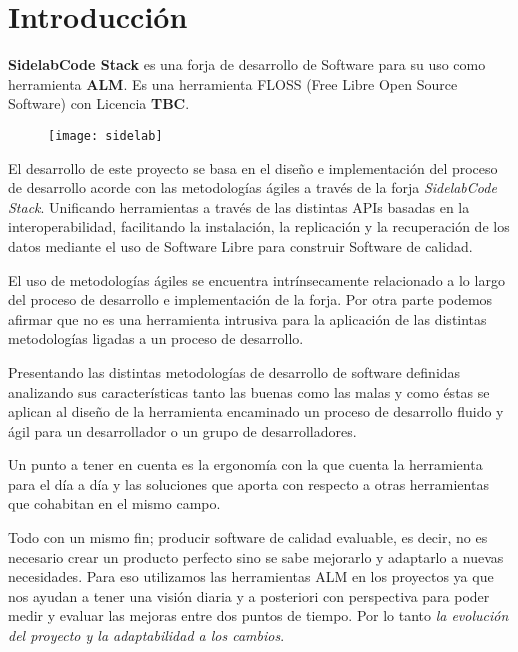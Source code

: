 \chapter{Introducci\'on}
\label{chap:introduccion}

\par \textbf{SidelabCode Stack} es una forja de desarrollo de Software para su uso como herramienta \textbf{ALM}. Es una herramienta FLOSS (Free Libre Open Source Software) con Licencia \textbf{TBC}.

\begin{figure}[h]
    \begin{center}	
        \texttt{[image: sidelab]}
        \label{fig:sidelab}
    \end{center}
\end{figure}

\par El desarrollo de este proyecto se basa en el dise\~no e implementaci\'on del proceso de desarrollo acorde con las metodolog\'ias \'agiles a trav\'es de la forja \emph{SidelabCode Stack}. Unificando herramientas a trav\'es de las distintas APIs basadas en la interoperabilidad, facilitando la instalaci\'on, la replicaci\'on y la recuperaci\'on de los datos mediante el uso de Software Libre para construir Software de calidad.

\par El uso de metodolog\'ias \'agiles se encuentra intr\'insecamente relacionado a lo largo del proceso de desarrollo e implementaci\'on de la forja. Por otra parte podemos afirmar que no es una herramienta intrusiva para la aplicaci\'on de las distintas metodolog\'ias ligadas a un proceso de desarrollo.

\par Presentando las distintas metodolog\'ias de desarrollo de software definidas analizando sus caracter\'isticas tanto las buenas como las malas y como \'estas se aplican al dise\~no de la herramienta encaminado un proceso de desarrollo fluido y \'agil para un desarrollador o un grupo de desarrolladores.

\par Un punto a tener en cuenta es la ergonom\'ia con la que cuenta la herramienta para el d\'ia a d\'ia y las soluciones que aporta con respecto a otras herramientas que cohabitan en el mismo campo.

\par Todo con un mismo fin; producir software de calidad evaluable, es decir, no es necesario crear un producto perfecto sino se sabe mejorarlo y adaptarlo a nuevas necesidades. Para eso utilizamos las herramientas ALM en los proyectos ya que nos ayudan a tener una visi\'on diaria y a posteriori con perspectiva para poder medir y evaluar las mejoras entre dos puntos de tiempo. Por lo tanto \emph{la evoluci\'on del proyecto y la adaptabilidad a los cambios}.

